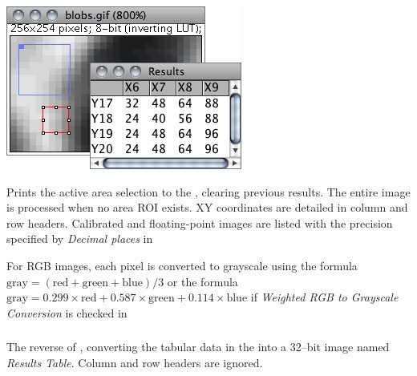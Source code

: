 \begin{minipage}[c][1\totalheight][t]{0.416\columnwidth}%
\includegraphics[scale=0.55]{images/ImageToResults}%
\end{minipage}%
\begin{minipage}[c][1\totalheight][t]{0.584\columnwidth}%
Prints the active area selection to the ,
clearing previous results. The entire image is processed when no area
ROI exists. XY coordinates are detailed in column and row headers.
Calibrated and floating-point images are listed with the precision
specified by \emph{Decimal places} in 
\medskip{}


For RGB images, each pixel is converted to grayscale using the formula
$\text{gray}=(\text{red}+\text{green}+\text{blue})/3$ or the formula
$\text{gray}=0.299\times\text{red}+0.587\times\text{green}+0.114\times\text{blue}$
if \emph{Weighted RGB to Grayscale Conversion} is checked in  %
\end{minipage}




\subsubsection[\protect\userinterface{Results to Image}]{\protect{}\label{sub:ResultsToImage}\feature{}}

The reverse of , converting the tabular
data in the  into a 32--bit image named
\emph{Results Table}. Column and row headers are ignored.


